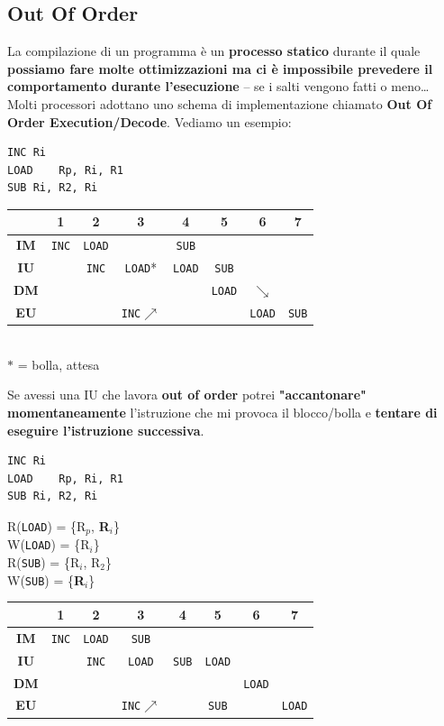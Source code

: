 \documentclass[10pt]{report}
\begin{document}
\subsection{Out Of Order}
La compilazione di un programma è un \textbf{processo statico} durante il quale \textbf{possiamo fare molte ottimizzazioni ma ci è impossibile prevedere il comportamento durante l'esecuzione} -- se i salti vengono fatti o meno\ldots\\
Molti processori adottano uno schema di implementazione chiamato \textbf{Out Of Order Execution/Decode}. Vediamo un esempio:
\begin{multicols}{2}
\begin{lstlisting}
INC	Ri
LOAD	Rp, Ri, R1
SUB	Ri, R2, Ri
\end{lstlisting}
\columnbreak

\begin{tabular}{c|c|c|c|c|c|c|c|}
	 & 1 & 2 & 3 & 4 & 5 & 6 & 7 \\
	\hline
	\textbf{IM} & \texttt{INC} & \texttt{LOAD} & & \texttt{SUB} & & & \\
	\hline
	\textbf{IU} & & \texttt{INC} & \texttt{LOAD}* & \texttt{LOAD} & \texttt{SUB} & & \\
	\hline
	\textbf{DM} & & & & & \texttt{LOAD} & $\searrow$ & \\
	\hline
	\textbf{EU} & & & \texttt{INC}$\nearrow$ & & & \texttt{LOAD} & \texttt{SUB} \\
	\hline
\end{tabular}\\
$*$ = bolla, attesa
\end{multicols}
Se avessi una IU che lavora \textbf{out of order} potrei \textbf{"accantonare" momentaneamente} l'istruzione che mi provoca il blocco/bolla e \textbf{tentare di eseguire l'istruzione successiva}.
\begin{multicols}{2}
\begin{lstlisting}
INC	Ri
LOAD	Rp, Ri, R1
SUB	Ri, R2, Ri
\end{lstlisting}
R(\texttt{LOAD}) = \{R$_p$, \textbf{R$_i$}\}\\
W(\texttt{LOAD}) = \{R$_i$\}\\
R(\texttt{SUB}) = \{R$_i$, R$_2$\}\\
W(\texttt{SUB}) = \{\textbf{R$_i$}\}\\
\columnbreak

\begin{tabular}{c|c|c|c|c|c|c|c|}
	 & 1 & 2 & 3 & 4 & 5 & 6 & 7 \\
	\hline
	\textbf{IM} & \texttt{INC} & \texttt{LOAD} & \texttt{SUB} & & & & \\
	\hline
	\textbf{IU} & & \texttt{INC} & \texttt{LOAD} & \texttt{SUB} & \texttt{LOAD} & & \\
	\hline
	\textbf{DM} & & & & & & \texttt{LOAD} & \\
	\hline
	\textbf{EU} & & & \texttt{INC}$\nearrow$ & & \texttt{SUB} & & \texttt{LOAD} \\
	\hline
\end{tabular}
\end{multicols}
\end{document}
